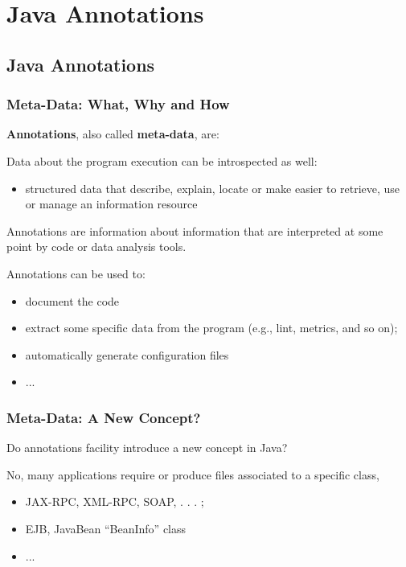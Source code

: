 \section{Java Annotations}

\subsection{Java Annotations}

\subsubsection{Meta-Data: What, Why and How}

\textbf{Annotations}, also called \textbf{meta-data}, are:

Data about the program execution can be introspected as well:
\begin{itemize}
	\item structured data that describe, explain, locate or make easier to retrieve, use or manage an information resource
\end{itemize}

Annotations are information about information that are interpreted at some point by code or data analysis tools.

Annotations can be used to:
\begin{itemize}
	\item document the code
	\item extract some specific data from the program (e.g., lint, metrics, and so on);
	\item automatically generate configuration files
	\item ...
\end{itemize}

\subsubsection{Meta-Data: A New Concept?}

Do annotations facility introduce a new concept in Java?

No, many applications require or produce files associated to a
specific class,

\begin{itemize}
	\item JAX-RPC, XML-RPC, SOAP, . . . ;
	\item EJB, JavaBean “BeanInfo” class
	\item ...
\end{itemize}

